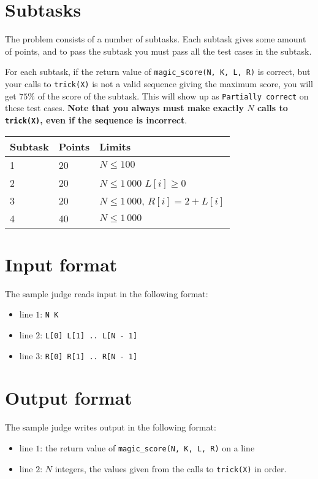 \section*{Subtasks}
The problem consists of a number of subtasks. Each subtask gives some amount of points, and to pass
the subtask you must pass all the test cases in the subtask.

For each subtask, if the return value of \texttt{magic\_score(N, K, L, R)} is correct, but your calls to \texttt{trick(X)}
is not a valid sequence giving the maximum score, you will get $75\%$ of the score of the subtask. This will show up as
\texttt{Partially correct} on these test cases. \textbf{Note that you always must make exactly $N$ calls to \texttt{trick(X)},
even if the sequence is incorrect}.

\begin{tabular}{|l|l|l|}
  \hline
  \textbf{Subtask} & \textbf{Points} & \textbf{Limits} \\ \hline
  1 & 20 & $N \le 100$ \\ \hline
  2 & 20 & $N \le 1\,000$ $L[i] \ge 0$\\ \hline
  3 & 20 & $N \le 1\,000$, $R[i] = 2 + L[i]$ \\ \hline
  4 & 40 & $N \le 1\,000$ \\ \hline
\end{tabular}

\section*{Input format}
The sample judge reads input in the following format:

\begin{itemize}
  \item line $1$: \texttt{N K}
  \item line $2$: \texttt{L[0] L[1] .. L[N - 1]}
  \item line $3$: \texttt{R[0] R[1] .. R[N - 1]}
\end{itemize}

\section*{Output format}
The sample judge writes output in the following format:

\begin{itemize}
  \item line $1$: the return value of \texttt{magic\_score(N, K, L, R)} on a line
  \item line $2$: $N$ integers, the values given from the calls to \texttt{trick(X)} in order.
\end{itemize}
